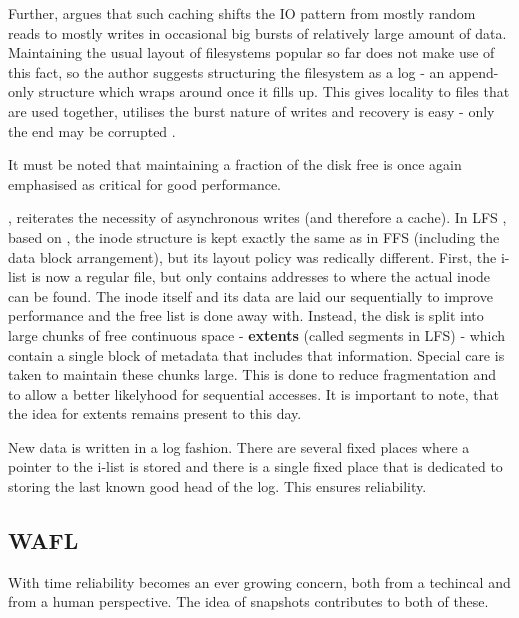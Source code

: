             Further, \citeauthor{IO_bottleneck} argues that such caching shifts
            the IO pattern from mostly random reads to mostly writes in
            occasional big bursts of relatively large amount of data.
            Maintaining the usual layout of filesystems popular so far does not
            make use of this fact, so the author suggests structuring the
            filesystem as a log - an append-only structure which wraps around
            once it fills up. This gives locality to files that are used
            together, utilises the burst nature of writes and recovery is easy
            - only the end may be corrupted \cite{IO_bottleneck}.

            It must be noted that maintaining a fraction of the disk free is
            once again emphasised as critical for good performance.

            \citeauthor{LFS}, reiterates the necessity of asynchronous writes
            (and therefore a cache). In LFS \cite{LFS}, based on
            \cite{IO_bottleneck}, the inode structure is kept exactly the same
            as in FFS (including the data block arrangement), but its layout
            policy was redically different. First, the i-list is now a regular
            file, but only contains addresses to where the actual inode can be
            found. The inode itself and its data are laid our sequentially to
            improve performance and the free list is done away with. Instead,
            the disk is split into large chunks of free continuous space -
            \textbf{extents} (called segments in LFS) - which contain a single
            block of metadata that includes that information.  Special care is
            taken to maintain these chunks large.  This is done to reduce
            fragmentation and to allow a better likelyhood for sequential
            accesses. It is important to note, that the idea for extents
            remains present to this day.

            New data is written in a log fashion. There are several fixed
            places where a pointer to the i-list is stored and there is a
            single fixed place that is dedicated to storing the last known good
            head of the log. This ensures reliability.

        \subsection{WAFL}

            With time reliability becomes an ever growing concern, both from a
            techincal and from a human perspective. The idea of snapshots
            contributes to both of these.

